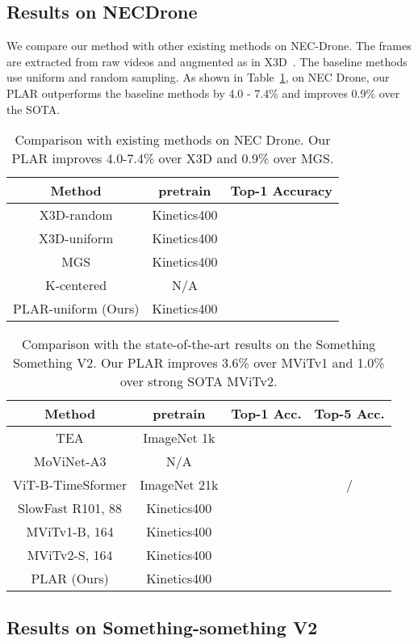 \documentclass[letterpaper, 10 pt, conference]{ieeeconf}
\begin{document}
\subsection{Results on NECDrone}
We compare our method with other existing methods on NEC-Drone. The frames are extracted from raw videos and augmented as in X3D~\cite{feichtenhofer2020x3d}. The baseline methods use uniform and random sampling. As shown in Table~\ref{tab:nec}, on NEC Drone, our PLAR outperforms the baseline methods by 4.0 - 7.4\% and improves 0.9\% over the SOTA.
\begin{table}[h]
\centering
\begin{tabular}{c c c}
\toprule
Method & pretrain  & Top-1 Accuracy   \\
\midrule
X3D-random \cite{feichtenhofer2020x3d} &  Kinetics400 &   \\
X3D-uniform \cite{feichtenhofer2020x3d} &  Kinetics400 &   \\
MGS \cite{zhi2021mgsampler} &  Kinetics400 &   \\ 
K-centered \cite{park2022k} &  N/A &   \\ 
PLAR-uniform (Ours) & Kinetics400 &   \\
\bottomrule
\end{tabular}
\caption{Comparison with existing methods on NEC Drone. Our PLAR improves 4.0-7.4\% over X3D and 0.9\% over MGS.}
\label{tab:nec}
\end{table} 
\begin{table}[t]
\centering
\begin{tabular}{c c c c}
\toprule
Method & pretrain  & Top-1 Acc. & Top-5 Acc.    \\
\midrule
TEA \cite{li2020tea} &  ImageNet 1k &  &  \\
MoViNet-A3 \cite{kondratyuk2021movinets} &  N/A &  &   \\
ViT-B-TimeSformer \cite{bertasius2021space} &  ImageNet 21k &  & / \\ 
SlowFast R101, 88 \cite{feichtenhofer2019slowfast} &  Kinetics400 &  &  \\ 
MViTv1-B, 164 \cite{fan2021multiscale} &  Kinetics400 &  &  \\ 
MViTv2-S, 164 \cite{li2022mvitv2} &  Kinetics400 &  &  \\ 
PLAR (Ours) & Kinetics400 &  &  \\
\bottomrule
\end{tabular}
\caption{Comparison with the state-of-the-art results on the Something Something V2. Our PLAR improves 3.6\% over MViTv1 and 1.0\% over strong SOTA MViTv2.}
\label{tab:ssv2}
\vspace{-3mm}
\end{table} \subsection{Results on Something-something V2}
\end{document}
